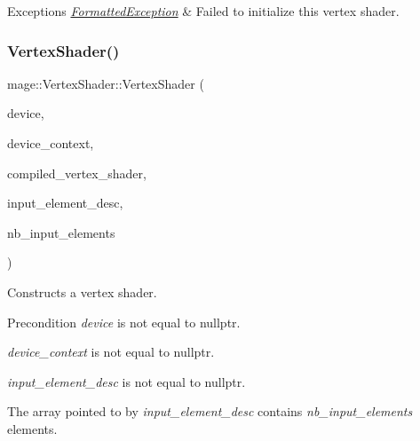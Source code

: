 \begin{DoxyExceptions}{Exceptions}
{\em \hyperlink{structmage_1_1_formatted_exception}{Formatted\+Exception}} & Failed to initialize this vertex shader. \\
\hline
\end{DoxyExceptions}
\hypertarget{classmage_1_1_vertex_shader_a0d649afa3b4b458b956630f010413536}{}\label{classmage_1_1_vertex_shader_a0d649afa3b4b458b956630f010413536} 
\subsubsection{\texorpdfstring{Vertex\+Shader()}{VertexShader()}\hspace{0.1cm}{\footnotesize\ttfamily [2/4]}}
{\footnotesize\ttfamily mage\+::\+Vertex\+Shader\+::\+Vertex\+Shader (\begin{DoxyParamCaption}\item[{I\+D3\+D11\+Device2 $\ast$}]{device,  }\item[{I\+D3\+D11\+Device\+Context2 $\ast$}]{device\+\_\+context,  }\item[{const \hyperlink{structmage_1_1_compiled_vertex_shader}{Compiled\+Vertex\+Shader} \&}]{compiled\+\_\+vertex\+\_\+shader,  }\item[{const D3\+D11\+\_\+\+I\+N\+P\+U\+T\+\_\+\+E\+L\+E\+M\+E\+N\+T\+\_\+\+D\+E\+SC $\ast$}]{input\+\_\+element\+\_\+desc,  }\item[{uint32\+\_\+t}]{nb\+\_\+input\+\_\+elements }\end{DoxyParamCaption})\hspace{0.3cm}{\ttfamily [explicit]}}

Constructs a vertex shader.

\begin{DoxyPrecond}{Precondition}
{\itshape device} is not equal to {\ttfamily nullptr}. 

{\itshape device\+\_\+context} is not equal to {\ttfamily nullptr}. 

{\itshape input\+\_\+element\+\_\+desc} is not equal to {\ttfamily nullptr}. 

The array pointed to by {\itshape input\+\_\+element\+\_\+desc} contains {\itshape nb\+\_\+input\+\_\+elements} elements. 
\end{DoxyPrecond}

